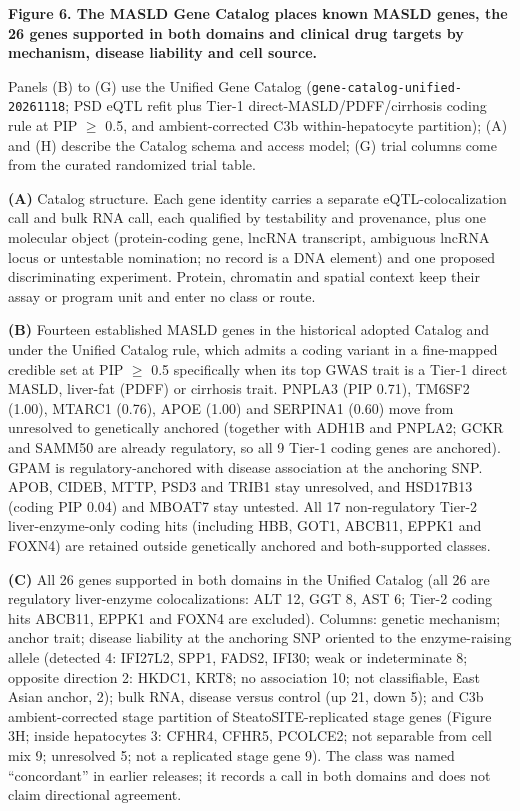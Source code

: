 \textbf{Figure 6. The MASLD Gene Catalog places known MASLD genes, the 26 genes supported in both domains and clinical drug targets by mechanism, disease liability and cell source.}



Panels (B) to (G) use the Unified Gene Catalog (\texttt{gene-catalog-unified-20261118}; PSD eQTL refit plus Tier-1 direct-MASLD/PDFF/cirrhosis coding rule at PIP $\ge$ 0.5, and ambient-corrected C3b within-hepatocyte partition); (A) and (H) describe the Catalog schema and access model; (G) trial columns come from the curated randomized trial table. 

\textbf{(A)} Catalog structure. Each gene identity carries a separate eQTL-colocalization call and bulk RNA call, each qualified by testability and provenance, plus one molecular object (protein-coding gene, lncRNA transcript, ambiguous lncRNA locus or untestable nomination; no record is a DNA element) and one proposed discriminating experiment. Protein, chromatin and spatial context keep their assay or program unit and enter no class or route.

\textbf{(B)} Fourteen established MASLD genes in the historical adopted Catalog and under the Unified Catalog rule, which admits a coding variant in a fine-mapped credible set at PIP $\ge$ 0.5 specifically when its top GWAS trait is a Tier-1 direct MASLD, liver-fat (PDFF) or cirrhosis trait. PNPLA3 (PIP 0.71), TM6SF2 (1.00), MTARC1 (0.76), APOE (1.00) and SERPINA1 (0.60) move from unresolved to genetically anchored (together with ADH1B and PNPLA2; GCKR and SAMM50 are already regulatory, so all 9 Tier-1 coding genes are anchored). GPAM is regulatory-anchored with disease association at the anchoring SNP. APOB, CIDEB, MTTP, PSD3 and TRIB1 stay unresolved, and HSD17B13 (coding PIP 0.04) and MBOAT7 stay untested. All 17 non-regulatory Tier-2 liver-enzyme-only coding hits (including HBB, GOT1, ABCB11, EPPK1 and FOXN4) are retained outside genetically anchored and both-supported classes.

\textbf{(C)} All 26 genes supported in both domains in the Unified Catalog (all 26 are regulatory liver-enzyme colocalizations: ALT 12, GGT 8, AST 6; Tier-2 coding hits ABCB11, EPPK1 and FOXN4 are excluded). Columns: genetic mechanism; anchor trait; disease liability at the anchoring SNP oriented to the enzyme-raising allele (detected 4: IFI27L2, SPP1, FADS2, IFI30; weak or indeterminate 8; opposite direction 2: HKDC1, KRT8; no association 10; not classifiable, East Asian anchor, 2); bulk RNA, disease versus control (up 21, down 5); and C3b ambient-corrected stage partition of SteatoSITE-replicated stage genes (Figure 3H; inside hepatocytes 3: CFHR4, CFHR5, PCOLCE2; not separable from cell mix 9; unresolved 5; not a replicated stage gene 9). The class was named ``concordant'' in earlier releases; it records a call in both domains and does not claim directional agreement.

